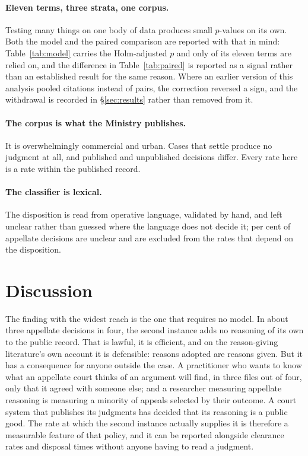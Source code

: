 \documentclass[11pt]{article}
\begin{document}
\paragraph{Eleven terms, three strata, one corpus.} Testing many things on one
body of data produces small $p$-values on its own. Both the model and the
paired comparison are reported with that in mind: Table~\ref{tab:model}
carries the Holm-adjusted $p$ and only \nHolmSurvivors{} of its eleven terms
are relied on, and the difference in Table~\ref{tab:paired} is reported as a
signal rather than an established result for the same reason. Where an earlier
version of this analysis pooled citations instead of pairs, the correction
reversed a sign, and the withdrawal is recorded in §\ref{sec:results} rather
than removed from it.

\paragraph{The corpus is what the Ministry publishes.} It is overwhelmingly
commercial and urban. Cases that settle produce no judgment at all, and
published and unpublished decisions differ. Every rate here is a rate within
the published record.

\paragraph{The classifier is lexical.} The disposition is read from operative
language, validated by hand, and left unclear rather than guessed where the
language does not decide it; \nUnclearShare{} per cent of appellate decisions
are unclear and are excluded from the rates that depend on the disposition.

\section{Discussion}
\label{sec:discussion}

The finding with the widest reach is the one that requires no model. In about
three appellate decisions in four, the second instance adds no reasoning of
its own to the public record. That is lawful, it is efficient, and on the
reason-giving literature's own account it is defensible: reasons adopted are
reasons given. But it has a consequence for anyone outside the case. A
practitioner who wants to know what an appellate court thinks of an argument
will find, in three files out of four, only that it agreed with someone else;
and a researcher measuring appellate reasoning is measuring a minority of
appeals selected by their outcome. A court system that publishes its
judgments has decided that its reasoning is a public good. The rate at which
the second instance actually supplies it is therefore a measurable feature of
that policy, and it can be reported alongside clearance rates and disposal
times without anyone having to read a judgment.
\end{document}
